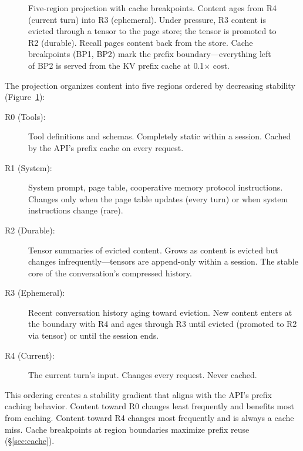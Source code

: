 \documentclass[sigplan,screen,anonymous]{acmart}
\begin{document}
\begin{figure}[t]
\caption{Five-region projection with cache breakpoints.
  Content ages from R4 (current turn) into R3 (ephemeral).
  Under pressure, R3 content is evicted through a tensor to the
  page store; the tensor is promoted to R2 (durable).
  Recall pages content back from the store.
  Cache breakpoints (BP1, BP2) mark the prefix boundary---everything
  left of BP2 is served from the KV prefix cache at 0.1$\times$ cost.}
\label{fig:regions}
\end{figure}

The projection organizes content into five regions ordered by
decreasing stability (Figure~\ref{fig:regions}):

\begin{description}
\item[R0 (Tools):] Tool definitions and schemas. Completely static
  within a session. Cached by the API's prefix cache on every request.

\item[R1 (System):] System prompt, page table, cooperative memory
  protocol instructions. Changes only when the page table updates
  (every turn) or when system instructions change (rare).

\item[R2 (Durable):] Tensor summaries of evicted content. Grows as
  content is evicted but changes infrequently---tensors are
  append-only within a session. The stable core of the conversation's
  compressed history.

\item[R3 (Ephemeral):] Recent conversation history aging toward
  eviction. New content enters at the boundary with R4 and ages
  through R3 until evicted (promoted to R2 via tensor) or until the
  session ends.

\item[R4 (Current):] The current turn's input. Changes every request.
  Never cached.
\end{description}

This ordering creates a stability gradient that aligns with the API's
prefix caching behavior. Content toward R0 changes least frequently
and benefits most from caching. Content toward R4 changes most
frequently and is always a cache miss. Cache breakpoints at region
boundaries maximize prefix reuse (\S\ref{sec:cache}).
\end{document}
